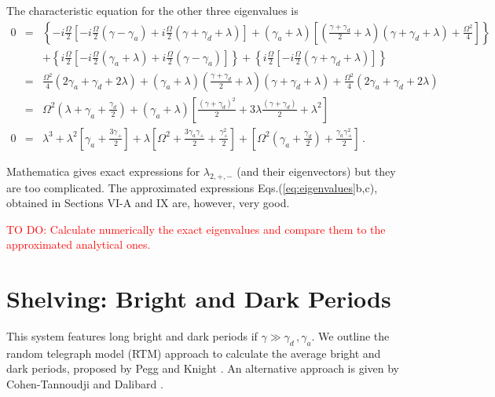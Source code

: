 \documentclass[twocolumn,aps,eqsecnum,showkeys,amsmath]{revtex4-2}
\begin{document}
\begin{widetext}
The characteristic equation for the other three eigenvalues is
%
\begin{eqnarray*} 	
0 &=& \left\{ - i \frac{\Omega}{2} 	\left[  
	- i \frac{\Omega}{2} (\gamma -\gamma_a)   
	+i \frac{\Omega}{2} (\gamma +\gamma_d +\lambda)  \right] 
	+(\gamma_a +\lambda) \left[ (\frac{\gamma +\gamma_d}{2} +\lambda) 
	(\gamma +\gamma_d +\lambda) +\frac{\Omega^2}{4} \right] \right\}  	\\ 
%
&& + \left\{ i \frac{\Omega}{2} \left[ -i \frac{\Omega}{2} (\gamma_a +\lambda)    
	+i \frac{\Omega}{2} (\gamma -\gamma_a)  \right]  \right\} 
+ \left\{ i \frac{\Omega}{2} 
	\left[ - i \frac{\Omega}{2} (\gamma +\gamma_d +\lambda) \right]  \right\} \\ 
%
&=& \frac{\Omega^2}{4} ( 2 \gamma_a +\gamma_d +2 \lambda ) 
+(\gamma_a +\lambda) (\frac{\gamma +\gamma_d}{2} +\lambda) 
	(\gamma +\gamma_d +\lambda) 
+\frac{\Omega^2}{4} ( 2 \gamma_a +\gamma_d +2 \lambda ) \\ 
%
&=& \Omega^2 ( \lambda +\gamma_a +\frac{\gamma_d}{2} ) 
	+(\gamma_a +\lambda) \left[ \frac{( \gamma +\gamma_d)^2}{2} 
	+3\lambda \frac{( \gamma +\gamma_d)}{2} 	+\lambda^2 \right] 	\\ 
%
0 &=& \lambda^3 +\lambda^2 \left[ \gamma_a +\frac{3 \gamma_+}{2} \right] 
+\lambda \left[ \Omega^2 +\frac{3 \gamma_a \gamma_+}{2}   
	+\frac{\gamma_+^2}{2} \right] 
+\left[ \Omega^2 (\gamma_a +\frac{\gamma_d}{2}) 
	+\frac{\gamma_a  \gamma_+^2}{2} \right] 	\,.
\end{eqnarray*}
\end{widetext}
Mathematica gives exact expressions for $\lambda_{2,+,-}$ (and their 
eigenvectors) but they are too complicated. The approximated expressions 
Eqs.(\ref{eq:eigenvalues}b,c), obtained in Sections VI-A and IX are, 
however, very good. 

\textcolor{red}{TO DO: Calculate numerically the exact eigenvalues and 
compare them to the approximated analytical ones.}

\section{Shelving: Bright and Dark Periods} 
This system features long bright and dark periods if 
$\gamma \gg \gamma_d\,, \gamma_a$. We outline the random telegraph 
model (RTM) approach to calculate the average bright and dark periods,  
proposed by Pegg and Knight \cite{PeKn88a,PeKn88b,EvKe02}. An 
alternative approach is given by Cohen-Tannoudji and Dalibard  
\cite{CTDa86}.  
\end{document}
